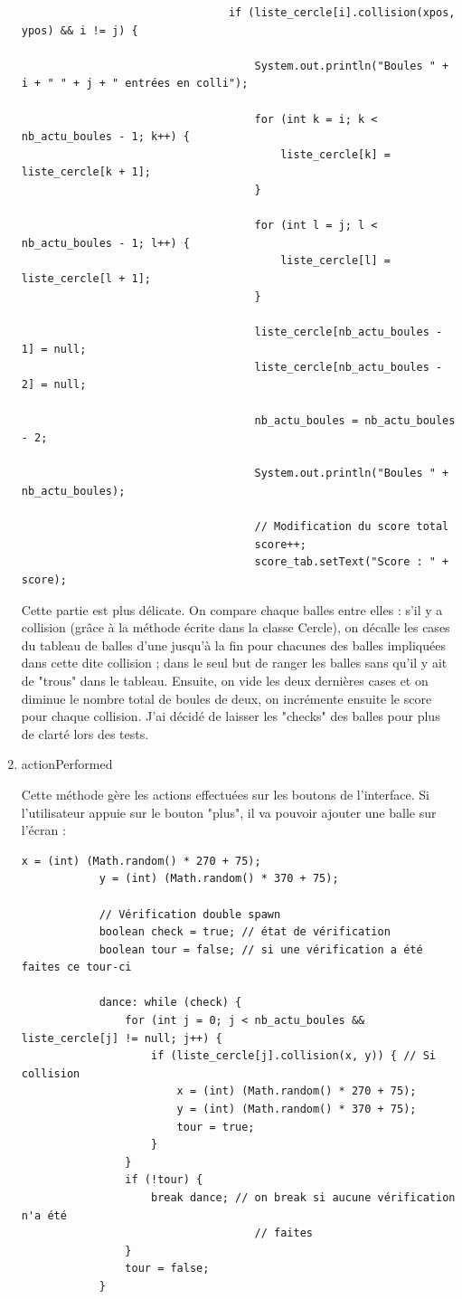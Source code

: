 \documentclass{article}
\begin{document}
\begin{enumerate}
\begin{verbatim}
								if (liste_cercle[i].collision(xpos, ypos) && i != j) {

									System.out.println("Boules " + i + " " + j + " entrées en colli");

									for (int k = i; k < nb_actu_boules - 1; k++) {
										liste_cercle[k] = liste_cercle[k + 1];
									}

									for (int l = j; l < nb_actu_boules - 1; l++) {
										liste_cercle[l] = liste_cercle[l + 1];
									}

									liste_cercle[nb_actu_boules - 1] = null;
									liste_cercle[nb_actu_boules - 2] = null;

									nb_actu_boules = nb_actu_boules - 2;

									System.out.println("Boules " + nb_actu_boules);

									// Modification du score total
									score++;
									score_tab.setText("Score : " + score);
\end{verbatim}

Cette partie est plus délicate. On compare chaque balles entre elles : s'il y a collision (grâce à la méthode écrite dans la classe Cercle), on décalle les cases du tableau de balles d'une jusqu'à la fin pour chacunes des balles impliquées dans cette dite collision ; dans le seul but de ranger les balles sans qu'il y ait de "trous" dans le tableau. Ensuite, on vide les deux dernières cases et on diminue le nombre total de boules de deux, on incrémente ensuite le score pour chaque collision.
J'ai décidé de laisser les "checks" des balles pour plus de clarté lors des tests.

\item actionPerformed
\label{item:start}

Cette méthode gère les actions effectuées sur les boutons de l'interface. Si l'utilisateur appuie sur le bouton "plus", il va pouvoir ajouter une balle sur l'écran :

\begin{verbatim}
x = (int) (Math.random() * 270 + 75);
			y = (int) (Math.random() * 370 + 75);

			// Vérification double spawn
			boolean check = true; // état de vérification
			boolean tour = false; // si une vérification a été faites ce tour-ci

			dance: while (check) {
				for (int j = 0; j < nb_actu_boules && liste_cercle[j] != null; j++) {
					if (liste_cercle[j].collision(x, y)) { // Si collision
						x = (int) (Math.random() * 270 + 75);
						y = (int) (Math.random() * 370 + 75);
						tour = true;
					}
				}
				if (!tour) {
					break dance; // on break si aucune vérification n'a été
									// faites
				}
				tour = false;
			}
\end{verbatim}


\end{enumerate}
\end{document}
